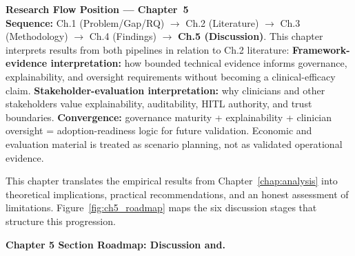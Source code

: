 \medskip\noindent
\small\textbf{Research Flow Position --- Chapter~5}\\[3pt]
\textbf{Sequence:} Ch.1 (Problem/Gap/RQ) $\to$ Ch.2 (Literature) $\to$ Ch.3 (Methodology) $\to$ Ch.4 (Findings) $\to$ \textbf{Ch.5 (Discussion)}.
This chapter interprets results from both pipelines in relation to Ch.2 literature:
\textbf{Framework-evidence interpretation:} how bounded technical evidence informs governance, explainability, and oversight requirements without becoming a clinical-efficacy claim.
\textbf{Stakeholder-evaluation interpretation:} why clinicians and other stakeholders value explainability, auditability, HITL authority, and trust boundaries.
\textbf{Convergence:} governance maturity + explainability + clinician oversight = adoption-readiness logic for future validation. Economic and evaluation material is treated as scenario planning, not as validated operational evidence.

\vspace{0.5em}

\noindent This chapter translates the empirical results from Chapter~\ref{chap:analysis} into theoretical implications, practical recommendations, and an honest assessment of limitations. Figure~\ref{fig:ch5_roadmap} maps the six discussion stages that structure this progression.



\noindent\textbf{Chapter 5 Section Roadmap: Discussion and.}

